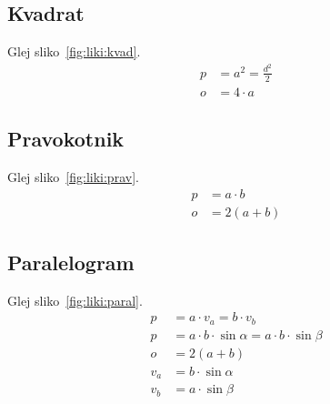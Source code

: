 \documentclass[a4paper,oneside,12pt,fleqn]{article}
\newcommand\krat\cdot
\numberwithin{equation}{section}
\begin{document}
\parbox[t]{0.5\textwidth}{
\subsection{Kvadrat}
Glej sliko~\ref{fig:liki:kvad}.
\label{sec:liki:kvad}
\begin{align*}
  p &=  a^2 = \frac{d^2}{2} \\
  o &=  4\krat a
\end{align*}

\subsection{Pravokotnik}
Glej sliko~\ref{fig:liki:prav}.
\label{sec:liki:prav}
\begin{align*}
  p &=  a \krat b \\
  o &=  2(a+b)
\end{align*}

\subsection{Paralelogram}
Glej sliko~\ref{fig:liki:paral}.
\label{sec:liki:paral}
\begin{align*}
  p &=  a\krat v_a = b\krat v_b \\
  p &= a\krat b\krat\sin\alpha = a\krat b\krat\sin\beta \\
  o &=  2(a+b) \\
  v_a &=  b\krat\sin\alpha \\
  v_b &=  a\krat\sin\beta
\end{align*}
}
\end{document}
